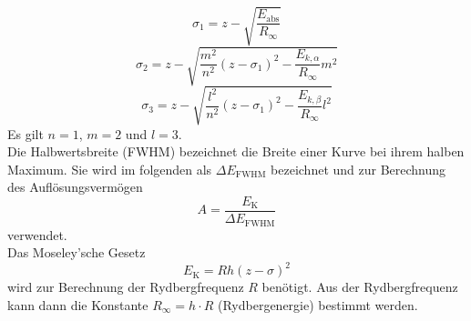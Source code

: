 \begin{equation}
    \sigma_1 = z - \sqrt{\frac{E_\text{abs}}{R_\infty}}
    \label{eqn:sigma1}
\end{equation}
\begin{equation}
    \sigma_2 = z - \sqrt{\frac{m^2}{n^2} \left( z - \sigma_1 \right)^2 - \frac{E_{k,\alpha}}{R_\infty}m^2}
    \label{eqn:sigma2}
\end{equation}
\begin{equation}
    \sigma_3 = z - \sqrt{\frac{l^2}{n^2} \left( z - \sigma_1 \right)^2 - \frac{E_{k,\beta}}{R_\infty}l^2}
    \label{eqn:sigma3}
\end{equation}
Es gilt $n=1$, $m=2$ und $l=3$.
\\
Die Halbwertsbreite (FWHM) bezeichnet die Breite einer Kurve bei ihrem halben Maximum.
Sie wird im folgenden als $\Delta E_\text{FWHM}$ bezeichnet und zur Berechnung des Auflösungsvermögen
\begin{equation}
    A = \frac{E_\text{K}}{\Delta E_\text{FWHM}}
    \label{eqn:aufloesung}
\end{equation}
verwendet.
\\
Das Moseley'sche Gesetz
\begin{equation}
    E_\text{K} = R h (z - \sigma )^2
    \label{eqn:moseley}
\end{equation}
wird zur Berechnung der Rydbergfrequenz $R$ benötigt.
Aus der Rydbergfrequenz kann dann die Konstante $R_\infty = h \cdot R$ (Rydbergenergie) bestimmt werden.